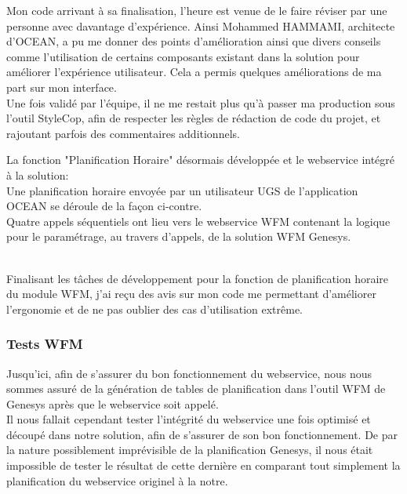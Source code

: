 \documentclass{rapport}
\begin{document}
Mon code arrivant à sa finalisation, l'heure est venue de le faire réviser par une personne avec davantage d'expérience. Ainsi Mohammed HAMMAMI, architecte d'OCEAN, a pu me donner des points d'amélioration ainsi que divers conseils comme l'utilisation de certains composants existant dans la solution pour améliorer l'expérience utilisateur. Cela a permis quelques améliorations de ma part sur mon interface.\\

Une fois validé par l'équipe, il ne me restait plus qu'à passer ma production sous l'outil StyleCop, afin de respecter les règles de rédaction de code du projet, et rajoutant parfois des commentaires additionnels.\\

\begin{minipage}{0.55\textwidth}
\end{minipage}
\begin{minipage}{0.35\textwidth}
La fonction "Planification Horaire" désormais développée et le webservice intégré à la solution:\\

Une planification horaire envoyée par un utilisateur UGS de l'application OCEAN se déroule de la façon ci-contre.\\

Quatre appels séquentiels ont lieu vers le webservice WFM contenant la logique pour le paramétrage, au travers d'appels, de la solution WFM Genesys.

\end{minipage}
\vspace{5mm} %
\\

Finalisant les tâches de développement pour la fonction de planification horaire du module WFM, j'ai reçu des avis sur mon code me permettant d'améliorer l'ergonomie et de ne pas oublier des cas d'utilisation extrême.

\subsubsection{Tests WFM}

Jusqu'ici, afin de s'assurer du bon fonctionnement du webservice, nous nous sommes assuré de la génération de tables de planification dans l'outil WFM de Genesys après que le webservice soit appelé.\\
Il nous fallait cependant tester l'intégrité du webservice une fois optimisé et découpé dans notre solution, afin de s'assurer de son bon fonctionnement. De par la nature possiblement imprévisible de la planification Genesys, il nous était impossible de tester le résultat de cette dernière en comparant tout simplement la planification du webservice originel à la notre.\\
\end{document}
